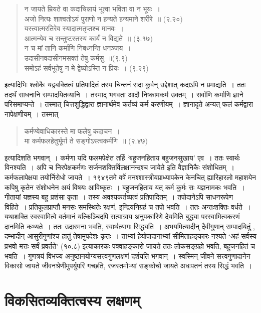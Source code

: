 {\begin{verse}
न जायते म्रियते वा कदाचिन्नायं भूत्वा भविता वा न भूयः~। \\
अजो नित्यः शाश्वतोऽयं पुराणो न हन्यते हन्यमाने शरीरे~॥ (२.२०) \\
यस्त्वात्मरतिरेव स्यादात्मतृप्तश्च मानवः~। \\
आत्मन्येव च सन्तुष्टस्तस्य कार्यं न विद्यते~॥ (३.१७)\\
न च मां तानि कर्माणि निबध्नन्ति धनञ्जय~। \\
उदासीनवदासीनमसक्तं तेषु कर्मसु~॥(९.९)\\
समोऽहं सर्वभूतेषु न मे द्वेष्योऽस्ति न प्रियः~। (९.२९)
\end{verse}
इत्यादिभिः श्लोकैः यद्व्यक्तित्वं प्रतिपादितं तस्य चिन्तनं सदा कुर्वन् उद्देशात् कदाऽपि न प्रमाद्यति~। ततः तदर्थं साधनानि सम्पादयितव्यानि~। तस्माद् भगवता आदौ निष्कामकर्म उक्तम्~। सर्वाणि कर्माणि ज्ञाने परिसमाप्यन्ते~। तस्मात् चित्तशुद्धिद्वारा ज्ञानार्थमेव कर्तव्यं कर्म करणीयम्~। ज्ञानादृते अन्यत् फलं कर्मद्वारा नापेक्षणीयम्~। तस्मात् 
\begin{verse}
कर्मण्येवाधिकारस्ते मा फलेषु कदाचन~। \\
मा कर्मफलहेतुर्भूर्मा ते सङ्गोऽस्त्वकर्मणि~॥ (२.४७)
\end{verse}
इत्यादिशति भगवान्~। कर्मणा यदि फलमपेक्षेत तर्हि ‘बहुजनहिताय बहुजनसुखाय' एव~। ततः स्वार्थः विनश्यति~। अपि च निरपेक्षकर्मणः सर्जनशक्तिर्विलक्षानन्दश्च जायेते इति वैज्ञानिकैः संशोधितम्~। कर्मफलापेक्षया तयोर्निरोधो जायते~। १९४९तमे वर्षे मनश्शास्त्रीयप्राध्यापकेन केनचित् ह्यारिहारलो महाशयेन कपिषु कृतेन संशोधनेन अयं विषयः आविष्कृतः~। बहुजनहिताय यत् कर्म कुर्मः सः यज्ञनामकः भवति~। गीतायां यज्ञस्य बहु प्रशंसा कृता~। तस्य अवश्यकर्तव्यत्वं प्रतिपादितम्~। तपोदानेऽपि साधनरूपेण विहिते~। प्रतिकूलप्राप्तौ मनसः समस्थितेः रक्षणं, इन्द्रियनिग्रहं च तपो भवति~। ततः अन्तःशक्तिः वर्धते~। यथाशक्ति स्वस्वामित्वे वर्तमानं यत्किञ्चिदपि सत्पात्राय अनुपकारिणे देयमिति बुद्ध्या परस्वामित्वकरणं दानमिति कथ्यते~। ततः उदारमना भवति, स्वार्थत्यागः सिद्ध्यति~। अभयमित्यादीन् दैवीगुणान् सम्पादयितुं , दम्भादीन् आसुरीगुणांश्च हातुं तेषामुपदेशः कृतः~। ताभ्यां हेयोपादानाभ्यां सीमिताहङ्कारः नश्यते ‘अहं सर्वस्य प्रभवो मत्तः सर्वं प्रवर्तते' (१०.८) इत्याकारकः पक्वाहङ्कारो जायते ततः लोकसङ्ग्रहो भवति, बहुजनहितं च भवति~। गुणत्रयं विभज्य अनुष्ठानयोग्यसत्त्वगुणलक्षणं दर्शयति भगवान्~। स्वस्मिन् जीवने सत्त्वगुणादानेन विकासो जायते  जीवनश्रेणीमुपर्युपरि गच्छति, रजस्तमोभ्यां सङ्कोचो जायते अधःपतनं तस्य सिद्धं भवति~। 
\newpage

\section*{विकसितव्यक्तित्वस्य लक्षणम्} 

}
